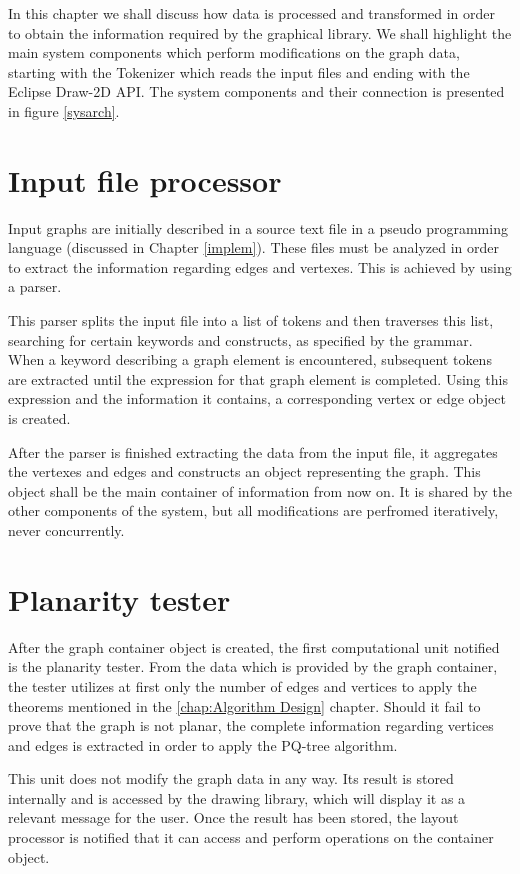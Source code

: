 In this chapter we shall discuss how data is processed and transformed in order to obtain 
the information required by the graphical library. We shall highlight the main system components 
which perform modifications on the graph data, starting with the Tokenizer which reads the input 
files and ending with the Eclipse Draw-2D API. The system components and their connection is presented 
in figure \ref{sysarch}.

\section{Input file processor}

Input graphs are initially described in a source text file in a pseudo programming language (discussed in 
Chapter \ref{implem}). These files must be analyzed in order to extract the information 
regarding edges and vertexes. This is achieved by using a parser.

This parser splits the input file into a list of tokens and then traverses this list, searching for certain 
keywords and constructs, as specified by the grammar. When a keyword describing a graph element is encountered, 
subsequent tokens are extracted until the expression for that graph element is completed. Using this expression 
and the information it contains, a corresponding vertex or edge object is created.

After the parser is finished extracting the data from the input file, it aggregates the vertexes and 
edges and constructs an object representing the graph. This object shall be the main container 
of information from now on. It is shared by the other components of the system, but all modifications are perfromed 
iteratively, never concurrently.

\section{Planarity tester}

After the graph container object is created, the first computational unit notified is the planarity tester. 
From the data which is provided by the graph container, the tester utilizes at first only the number of edges 
and vertices to apply the theorems mentioned in the \ref{chap:Algorithm Design} chapter. Should it fail 
to prove that the graph is not planar, the complete information regarding vertices and edges is extracted 
in order to apply the PQ-tree algorithm.

This unit does not modify the graph data in any way. Its result is stored internally and is accessed by the 
drawing library, which will display it as a relevant message for the user. Once the result has been stored, 
the layout processor is notified that it can access and perform operations on the container object.

